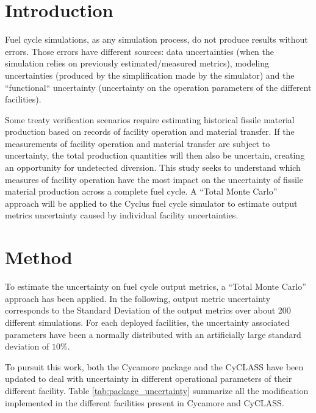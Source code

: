 \documentclass{anstrans}
\title{}
\author{Baptiste Mouginot,$^{*}$ Kathryn Mummah,$^{*}$ Paul P.H. Wilson$^{*}$}
\institute{
$^{*}$University of Wisconsin-Madison, WI
}
\begin{document}
\section{Introduction}

Fuel cycle simulations, as any simulation process, do not produce results
without errors. Those errors have different sources: data uncertainties (when
the simulation relies on previously estimated/measured metrics), modeling
uncertainties (produced by the simplification made by the simulator) and the
``functional`` uncertainty (uncertainty on the operation parameters of the
different facilities).

Some treaty verification scenarios require estimating historical fissile
material production based on records of facility operation and material
transfer.  If the measurements of facility operation and material transfer are
subject to uncertainty, the total production quantities will then also be
uncertain, creating an opportunity for undetected diversion.  This study seeks
to understand which measures of facility operation have the most impact on the
uncertainty of fissile material production across a complete fuel cycle.  A
``Total Monte Carlo'' approach will be applied to the Cyclus fuel cycle simulator
\cite{cyclus} to estimate output metrics uncertainty caused by individual
facility uncertainties.

\section{Method}

To estimate the uncertainty on fuel cycle output metrics, a ``Total Monte
Carlo'' approach has been applied. In the following, output metric uncertainty
corresponds to the Standard Deviation of the output metrics over about 200
different simulations. For each deployed facilities, the uncertainty associated
parameters have been a normally distributed with an artificially large standard
deviation of $10\%$.

To pursuit this work, both the Cycamore\cite{cycamore} package and the
CyCLASS\cite{cyclass} have been updated to deal with uncertainty in different
operational parameters of their different facility.  Table
\ref{tab:package_uncertainty} summarize all the modification implemented in the
different facilities present in Cycamore and CyCLASS.
\end{document}

